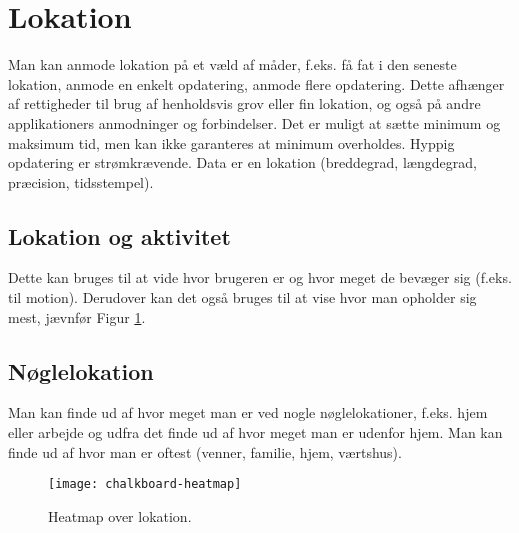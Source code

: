 \section{Lokation}
Man kan anmode lokation på et væld af måder, f.eks. få fat i den seneste lokation, anmode en enkelt opdatering, anmode flere opdatering. 
Dette afhænger af rettigheder til brug af henholdsvis grov eller fin lokation, og også på andre applikationers anmodninger og forbindelser. Det er muligt at sætte minimum og maksimum tid, men kan ikke garanteres at minimum overholdes. Hyppig opdatering er strømkrævende. 
Data er en lokation (breddegrad, længdegrad, præcision, tidsstempel).

\subsection{Lokation og aktivitet}
Dette kan bruges til at vide hvor brugeren er og hvor meget de bevæger sig (f.eks. til motion).
Derudover kan det også bruges til at vise hvor man opholder sig mest, jævnfør Figur \ref{heatmap}.
\subsection{Nøglelokation}
Man kan finde ud af hvor meget man er ved nogle nøglelokationer, f.eks. hjem eller arbejde og udfra det finde ud af hvor meget man er udenfor hjem. Man kan finde ud af hvor man er oftest (venner, familie, hjem, værtshus).

\begin{figure}[h]
	\centering
	\texttt{[image: chalkboard-heatmap]}
	\caption{Heatmap over lokation.}\label{heatmap}
\end{figure}

